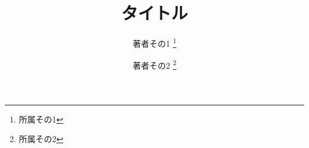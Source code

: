 \documentclass[a4j,10pt]{jsarticle}
\begin{document}

\title{タイトル}

\author{
    著者その1 \thanks{所属その1}
    \and
    著者その2 \thanks{所属その2}
}



\maketitle
\thispagestyle{empty}











\end{document}
